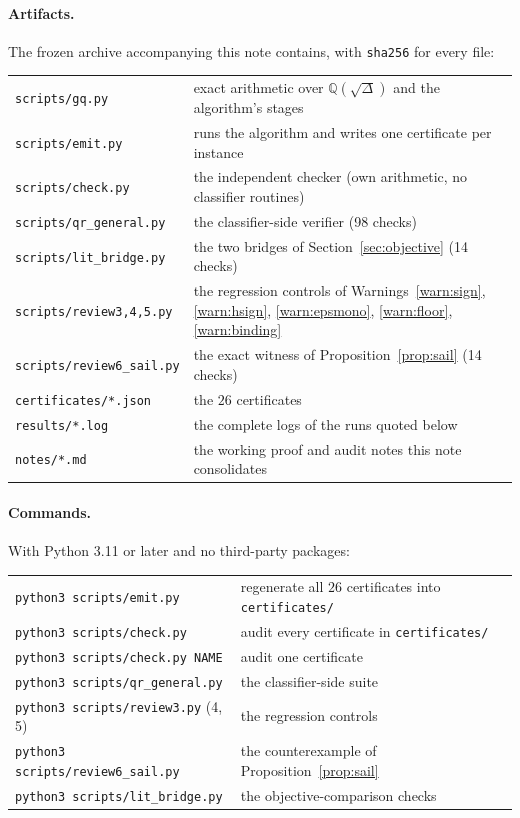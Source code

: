 \documentclass[11pt]{article}
\theoremstyle{definition}
\theoremstyle{remark}
\newcommand{\Q}{\mathbb{Q}}
\begin{document}
\paragraph{Artifacts.}
The frozen archive accompanying this note contains, with \texttt{sha256} for every file:
\begin{center}\small
\begin{tabular}{@{}ll@{}}
\toprule
\texttt{scripts/gq.py} & exact arithmetic over $\Q(\sqrt\Delta)$ and the algorithm's stages \\
\texttt{scripts/emit.py} & runs the algorithm and writes one certificate per instance \\
\texttt{scripts/check.py} & the independent checker (own arithmetic, no classifier routines) \\
\texttt{scripts/qr\_general.py} & the classifier-side verifier (98 checks) \\
\texttt{scripts/lit\_bridge.py} & the two bridges of Section~\ref{sec:objective} (14 checks) \\
\texttt{scripts/review3,4,5.py} & the regression controls of Warnings~\ref{warn:sign},
  \ref{warn:hsign}, \ref{warn:epsmono}, \ref{warn:floor}, \ref{warn:binding} \\
\texttt{scripts/review6\_sail.py} & the exact witness of Proposition~\ref{prop:sail}
  (14 checks) \\
\texttt{certificates/*.json} & the $26$ certificates \\
\texttt{results/*.log} & the complete logs of the runs quoted below \\
\texttt{notes/*.md} & the working proof and audit notes this note consolidates \\
\bottomrule
\end{tabular}
\end{center}

\paragraph{Commands.} With Python 3.11 or later and no third-party packages:
\begin{center}\small
\begin{tabular}{@{}ll@{}}
\toprule
\texttt{python3 scripts/emit.py} & regenerate all $26$ certificates into \texttt{certificates/} \\
\texttt{python3 scripts/check.py} & audit every certificate in \texttt{certificates/} \\
\texttt{python3 scripts/check.py NAME} & audit one certificate \\
\texttt{python3 scripts/qr\_general.py} & the classifier-side suite \\
\texttt{python3 scripts/review3.py} (4, 5) & the regression controls \\
\texttt{python3 scripts/review6\_sail.py} & the counterexample of
  Proposition~\ref{prop:sail} \\
\texttt{python3 scripts/lit\_bridge.py} & the objective-comparison checks \\
\bottomrule
\end{tabular}
\end{center}
\end{document}
